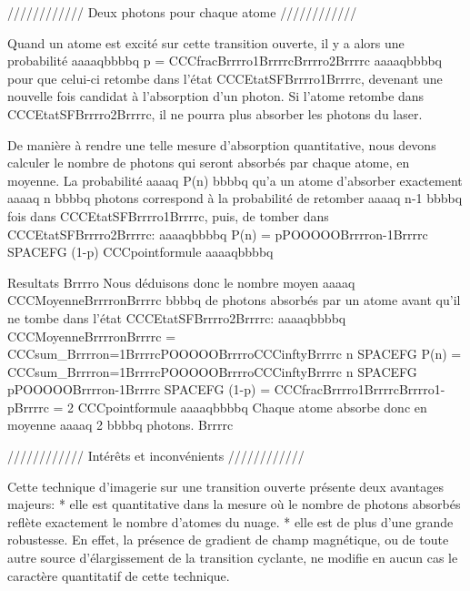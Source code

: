 //////////// Deux photons pour chaque atome ////////////

Quand un atome est excité sur cette transition ouverte, il y a alors une probabilité 
aaaaqbbbbq
p = CCCfracBrrrro1BrrrrcBrrrro2Brrrrc
aaaaqbbbbq
pour que celui-ci retombe dans l'état CCCEtatSFBrrrro1Brrrrc, devenant une nouvelle fois candidat à l'absorption d'un photon. Si l'atome retombe
 dans CCCEtatSFBrrrro2Brrrrc, il ne pourra plus absorber les photons du laser. 

De manière à rendre une telle mesure d'absorption quantitative, nous devons calculer le nombre de photons qui seront absorbés par chaque atome, en moyenne. La probabilité aaaaq P(n) bbbbq qu'a un atome d'absorber exactement aaaaq n bbbbq photons correspond à la probabilité de retomber aaaaq n-1 bbbbq fois dans CCCEtatSFBrrrro1Brrrrc, puis, de tomber dans CCCEtatSFBrrrro2Brrrrc:
aaaaqbbbbq
P(n) = pPOOOOOBrrrron-1Brrrrc SPACEFG (1-p)
CCCpointformule
aaaaqbbbbq




Resultats
Brrrro
Nous déduisons donc le nombre moyen aaaaq CCCMoyenneBrrrronBrrrrc bbbbq de photons absorbés par un atome avant qu'il ne tombe dans l'état CCCEtatSFBrrrro2Brrrrc:
aaaaqbbbbq
CCCMoyenneBrrrronBrrrrc 
= CCCsum_Brrrron=1BrrrrcPOOOOOBrrrroCCCinftyBrrrrc n SPACEFG P(n) 
= CCCsum_Brrrron=1BrrrrcPOOOOOBrrrroCCCinftyBrrrrc n SPACEFG pPOOOOOBrrrron-1Brrrrc SPACEFG (1-p) 
= CCCfracBrrrro1BrrrrcBrrrro1-pBrrrrc 
= 2
CCCpointformule
aaaaqbbbbq
Chaque atome absorbe donc en moyenne aaaaq 2 bbbbq photons.
Brrrrc	


//////////// Intérêts et inconvénients ////////////

Cette technique d'imagerie sur une transition ouverte présente deux avantages majeurs:
	* elle est quantitative dans la mesure où le nombre de photons absorbés reflète exactement le nombre d'atomes du nuage.
	* elle est de plus d'une grande robustesse. En effet, la présence de gradient de champ magnétique, ou de toute autre source d'élargissement de la transition cyclante, ne modifie en aucun cas le caractère quantitatif de cette technique. 



